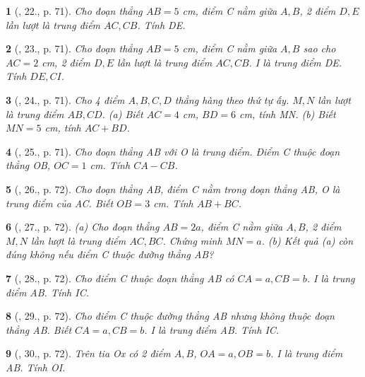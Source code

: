 \documentclass{article}
\newtheorem{baitoan}{}
\begin{document}
\begin{baitoan}[\cite{Binh_Toan_6_tap_2}, 22., p. 71]
	Cho đoạn thẳng $AB = 5$ {\rm cm}, điểm C nằm giữa $A,B$, 2 điểm $D,E$ lần lượt là trung điểm $AC,CB$. Tính  DE.
\end{baitoan}

\begin{baitoan}[\cite{Binh_Toan_6_tap_2}, 23., p. 71]
	Cho đoạn thẳng $AB = 5$ {\rm cm}, điểm C nằm giữa $A,B$ sao cho $AC = 2$ {\rm cm}, 2 điểm $D,E$ lần lượt là trung điểm $AC,CB$. I là trung điểm DE. Tính  $DE,CI$.
\end{baitoan}

\begin{baitoan}[\cite{Binh_Toan_6_tap_2}, 24., p. 71]
	Cho 4 điểm $A,B,C,D$ thẳng hàng theo thứ tự ấy. $M,N$ lần lượt là trung điểm $AB,CD$. (a) Biết $AC = 4$ {\rm cm}, $BD = 6$ {\rm cm}, tính MN. (b) Biết $MN = 5$ {\rm cm}, tính $AC + BD$.
\end{baitoan}

\begin{baitoan}[\cite{Binh_Toan_6_tap_2}, 25., p. 71]
	Cho đoạn thẳng AB với O là trung điểm. Điểm C thuộc đoạn thẳng OB, $OC = 1$ {\rm cm}. Tính $CA - CB$.
\end{baitoan}

\begin{baitoan}[\cite{Binh_Toan_6_tap_2}, 26., p. 72]
	Cho đoạn thẳng AB, điểm C nằm trong đoạn thẳng AB, O là trung điểm của AC. Biết $OB = 3$ {\rm cm}. Tính $AB + BC$.
\end{baitoan}

\begin{baitoan}[\cite{Binh_Toan_6_tap_2}, 27., p. 72]
	(a) Cho đoạn thẳng $AB = 2a$, điểm C nằm giữa $A,B$, 2 điểm $M,N$ lần lượt là trung điểm $AC,BC$. Chứng minh $MN = a$. (b) Kết quả (a) còn đúng không nếu điểm C thuộc đường thẳng AB?
\end{baitoan}

\begin{baitoan}[\cite{Binh_Toan_6_tap_2}, 28., p. 72]
	Cho điểm C thuộc đoạn thẳng AB có $CA = a,CB = b$. I là trung điểm AB. Tính IC.
\end{baitoan}

\begin{baitoan}[\cite{Binh_Toan_6_tap_2}, 29., p. 72]
	Cho điểm C thuộc đường thẳng AB nhưng không thuộc đoạn thẳng AB. Biết $CA = a,CB = b$. I là trung điểm AB. Tính IC.
\end{baitoan}

\begin{baitoan}[\cite{Binh_Toan_6_tap_2}, 30., p. 72]
	Trên tia Ox có 2 điểm $A,B$, $OA = a,OB = b$. I là trung điểm AB. Tính OI.
\end{baitoan}
\end{document}
